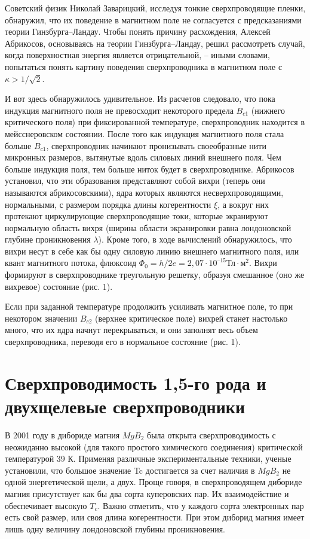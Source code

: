 Советский физик Николай Заварицкий, исследуя тонкие сверхпроводящие пленки, 
обнаружил, что их поведение в магнитном поле не согласуется с предсказаниями 
теории Гинзбурга–Ландау. Чтобы понять причину расхождения, Алексей Абрикосов, 
основываясь на теории Гинзбурга–Ландау, решил рассмотреть случай, когда 
поверхностная энергия является отрицательной, -- иными словами, попытаться 
понять картину поведения сверхпроводника в магнитном поле с 
\( \kappa > 1/\sqrt{2} \).

И вот здесь обнаружилось удивительное. Из расчетов следовало, что пока 
индукция магнитного поля не превосходит некоторого предела \( B_{c1} \) 
(нижнего критического поля) при фиксированной температуре, сверхпроводник 
находится в мейсснеровском состоянии. После того как индукция магнитного поля 
стала больше \( B_{c1} \), сверхпроводник начинают пронизывать своеобразные 
нити микронных размеров, вытянутые вдоль силовых линий внешнего поля. Чем 
больше индукция поля, тем больше ниток будет в сверхпроводнике. Абрикосов 
установил, что эти образования представляют собой вихри (теперь они называются 
абрикосовскими), ядра которых являются несверхпроводящими, нормальными, с 
размером порядка длины когерентности \( \xi \), а вокруг них протекают 
циркулирующие сверхпроводящие токи, которые экранируют нормальную область 
вихря (ширина области экранировки равна лондоновской глубине проникновения 
\( \lambda \)). Кроме того, в ходе вычислений обнаружилось, что вихри несут в 
себе как бы одну силовую линию внешнего магнитного поля, или квант магнитного 
потока, флюксоид \( \Phi_0 = h/2e = 2,07\cdot10^{–15} \text{Тл}\cdot{м}^2 \). 
Вихри формируют в сверхпроводнике треугольную решетку, образуя смешанное 
(оно же вихревое) состояние (рис. 1).

Если при заданной температуре продолжить усиливать магнитное поле, то при 
некотором значении \( B_{c2} \) (верхнее критическое поле) вихрей станет 
настолько много, что их ядра начнут перекрываться, и они заполнят весь 
объем сверхпроводника, переводя его в нормальное состояние (рис. 1). 

\section{Сверхпроводимость 1,5-го рода и двухщелевые сверхпроводники}
В 2001 году в дибориде магния \( MgB_2 \) была открыта сверхпроводимость с 
неожиданно высокой (для такого простого химического соединения) критической 
температурой 39 К. Применяя различные экспериментальные техники, ученые 
установили, что большое значение Tc достигается за счет наличия в \( MgB_2 \) 
не одной энергетической щели, а двух. Проще говоря, в сверхпроводящем дибориде 
магния присутствует как бы два сорта куперовских пар. Их взаимодействие и 
обеспечивает высокую \( T_c \). Важно отметить, что у каждого сорта 
электронных пар есть свой размер, или своя длина когерентности. При этом 
диборид магния имеет лишь одну величину лондоновской глубины проникновения.

